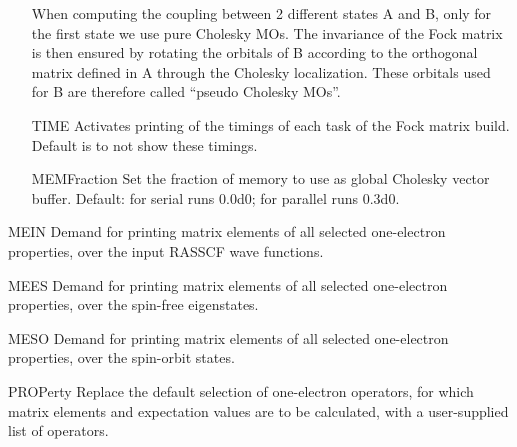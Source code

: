 \begin{keywordlist}
\begin{itemize}
When computing the coupling between 2 different
states A and B, only for the first state we use pure Cholesky MOs. The invariance of the Fock matrix
is then ensured by rotating the orbitals of B according to the orthogonal matrix defined in A
through the Cholesky localization. These orbitals used for B are therefore called ``pseudo Cholesky MOs''.
\item[TIME]
Activates printing of the timings of each task of the Fock matrix build.
Default is to not show these timings.
\item[MEMFraction]
Set the fraction of memory to use as global Cholesky vector buffer.
Default: for serial runs 0.0d0; for parallel runs 0.3d0.
\end{itemize}
\item[MEIN]
Demand for printing matrix elements of all selected one-electron
properties, over the input RASSCF wave functions.
\item[MEES]
Demand for printing matrix elements of all selected one-electron
properties, over the spin-free eigenstates.
\item[MESO]
Demand for printing matrix elements of all selected one-electron
properties, over the spin-orbit states.
\item[PROPerty]
Replace the default selection of one-{}electron operators, for which
matrix elements and expectation values are to be calculated, with a
user-{}supplied list of operators.


\end{keywordlist}
